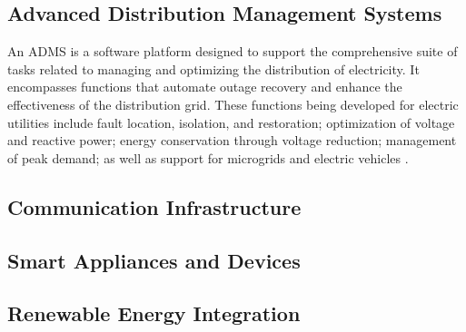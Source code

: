 \subsection{Advanced Distribution Management Systems }
An ADMS is a software platform designed to support the comprehensive suite of tasks related to managing and optimizing the distribution of electricity. It encompasses functions that automate outage recovery and enhance the effectiveness of the distribution grid. These functions being developed for electric utilities include fault location, isolation, and restoration; optimization of voltage and reactive power; energy conservation through voltage reduction; management of peak demand; as well as support for microgrids and electric vehicles \cite{avazov2016advanced}.






\subsection{Communication Infrastructure}
\subsection{Smart Appliances and Devices}
\subsection{Renewable Energy Integration}


